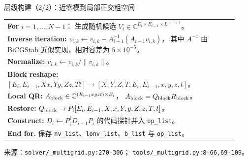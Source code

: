 \documentclass[UTF8,aspectratio=169,11pt]{ctexbeamer}
\newcommand{\source}[1]{%
  \vspace{0.06em}\par{\raggedright\scriptsize\color{muted}来源：#1\par}}
\newcommand{\pathref}[1]{\nolinkurl{#1}}
\begin{document}
\begin{frame}[t]{层级构建（2/2）：近零模到局部正交粗空间}
  \begin{center}
    \small
    \begin{tabular}{@{}p{0.93\linewidth}@{}}
      \toprule
      \textbf{For } $i=1,\ldots,N-1$：
      生成随机候选 $V_i\in\mathbb{C}^{E_i\times E_{i-1}\times L^{(i-1)}}$。
      \\
      \quad \textbf{Inverse iteration:}\quad
      $v_{i,k}\gets v_{i,k}-A_{i-1}^{-1}(A_{i-1}v_{i,k})$，
      其中 $A^{-1}$ 由 BiCGStab 近似实现，相对容差为 $5\times10^{-5}$。
      \\
      \quad \textbf{Normalize:}\quad
      $v_{i,k}\gets v_{i,k}/\|v_{i,k}\|$。
      \\
      \quad \textbf{Block reshape:}\quad
      $[E_i,E_{i-1},Xx,Yy,Zz,Tt]\to
      [X,Y,Z,T,E_i,E_{i-1},x,y,z,t]$。
      \\
      \quad \textbf{Local QR:}\quad
      $A_{\rm block}\in\mathbb{C}^{(E_{i-1}xyzt)\times E_i}$，
      $A_{\rm block}=Q_{\rm block}R_{\rm block}$。
      \\
      \quad \textbf{Restore:}\quad
      $Q_{\rm block}\to
      P_i[E_i,E_{i-1},X,x,Y,y,Z,z,T,t]$。
      \\
      \quad \textbf{Construct:}\quad
      $D_i\gets P_i^\dagger D_{i-1}P_i$ 的代码探针并入
      \texttt{op\_list}。
      \\
      \textbf{End for.}\quad
      保存 \texttt{nv\_list}、\texttt{lonv\_list}、\texttt{b\_list} 与 \texttt{op\_list}。
      \\
      \bottomrule
    \end{tabular}
  \end{center}
  \source{\pathref{solver/_multigrid.py:270-306}；
  \pathref{tools/_multigrid.py:8-66,69-109}。}
\end{frame}
\end{document}
